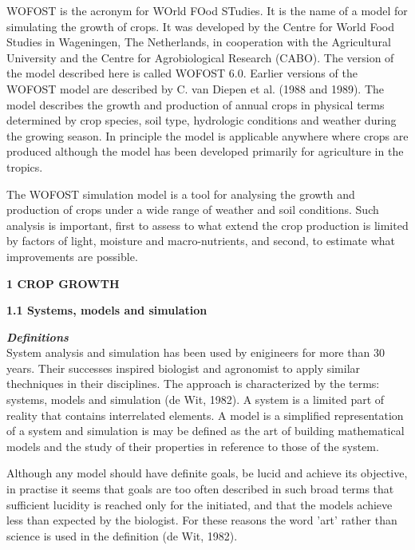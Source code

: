\documentclass[11pt]{article}
\begin{document}
\bigskip
WOFOST is the acronym for WOrld FOod STudies. It is the name of a model for
simulating the growth of crops. It was developed by the Centre for World Food
Studies in Wageningen, The Netherlands, in cooperation with the Agricultural
University and the Centre for Agrobiological Research (CABO). The version of the
model described here is called WOFOST 6.0. Earlier versions of the WOFOST
model are described by C. van Diepen et al. (1988 and 1989). The model describes
the growth and production of annual crops in physical terms deter\-mined by crop
species, soil type, hydrologic conditions and weather during the growing season. In
principle the model is applicable anywhere where crops are produced although the
model has been developed primarily for agriculture in the tropics.

\bigskip
The WOFOST simulation model is a tool for analysing the growth and production of
crops under a wide range of weather and soil conditions. Such analysis is important,
first to assess to what extend the crop production is limited by factors of light,
moisture and macro-nutrients, and second, to estimate what improvements are
possible.

{\bf 1 CROP GROWTH} 

{\bf 1.1 Systems, models and simulation }

{\bf {\it Definitions\/}}\\
System analysis and simulation has been used by enigineers for more than 30 years.
Their successes inspired biologist and agronomist to apply similar thechniques in their
disciplines. The approach is characterized by the terms: systems, models and simula\-tion (de Wit, 1982). A system is a limited part of reality that contains interrelated
elements. A model is a simplified representation of a system and simulation is may be
defined as the art of building mathemati\-cal models and the study of their properties
in reference to those of the system.

Although any model should have definite goals, be lucid and achieve its objective, in
practise it seems that goals are too often described in such broad terms that sufficient
lucidity  is reached only for the initiated, and that the models achieve less than
expected by the biologist. For these reasons the word 'art' rather than science is used
in the definition (de Wit, 1982).
\end{document}
